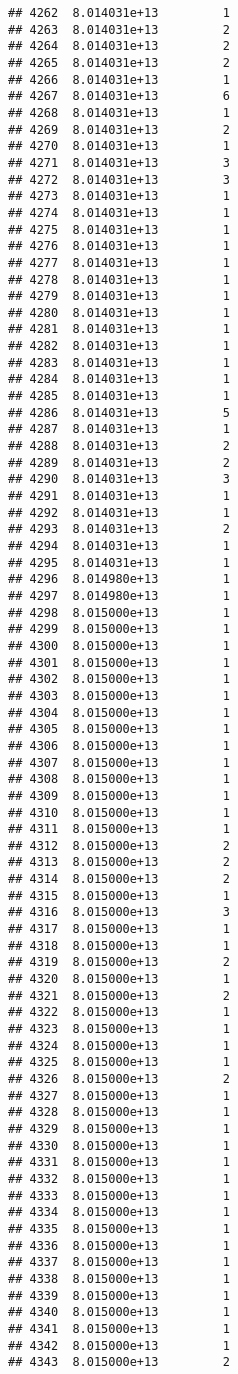 \documentclass[
]{article}
\begin{document}
\begin{verbatim}
## 4262  8.014031e+13         1
## 4263  8.014031e+13         2
## 4264  8.014031e+13         2
## 4265  8.014031e+13         2
## 4266  8.014031e+13         1
## 4267  8.014031e+13         6
## 4268  8.014031e+13         1
## 4269  8.014031e+13         2
## 4270  8.014031e+13         1
## 4271  8.014031e+13         3
## 4272  8.014031e+13         3
## 4273  8.014031e+13         1
## 4274  8.014031e+13         1
## 4275  8.014031e+13         1
## 4276  8.014031e+13         1
## 4277  8.014031e+13         1
## 4278  8.014031e+13         1
## 4279  8.014031e+13         1
## 4280  8.014031e+13         1
## 4281  8.014031e+13         1
## 4282  8.014031e+13         1
## 4283  8.014031e+13         1
## 4284  8.014031e+13         1
## 4285  8.014031e+13         1
## 4286  8.014031e+13         5
## 4287  8.014031e+13         1
## 4288  8.014031e+13         2
## 4289  8.014031e+13         2
## 4290  8.014031e+13         3
## 4291  8.014031e+13         1
## 4292  8.014031e+13         1
## 4293  8.014031e+13         2
## 4294  8.014031e+13         1
## 4295  8.014031e+13         1
## 4296  8.014980e+13         1
## 4297  8.014980e+13         1
## 4298  8.015000e+13         1
## 4299  8.015000e+13         1
## 4300  8.015000e+13         1
## 4301  8.015000e+13         1
## 4302  8.015000e+13         1
## 4303  8.015000e+13         1
## 4304  8.015000e+13         1
## 4305  8.015000e+13         1
## 4306  8.015000e+13         1
## 4307  8.015000e+13         1
## 4308  8.015000e+13         1
## 4309  8.015000e+13         1
## 4310  8.015000e+13         1
## 4311  8.015000e+13         1
## 4312  8.015000e+13         2
## 4313  8.015000e+13         2
## 4314  8.015000e+13         2
## 4315  8.015000e+13         1
## 4316  8.015000e+13         3
## 4317  8.015000e+13         1
## 4318  8.015000e+13         1
## 4319  8.015000e+13         2
## 4320  8.015000e+13         1
## 4321  8.015000e+13         2
## 4322  8.015000e+13         1
## 4323  8.015000e+13         1
## 4324  8.015000e+13         1
## 4325  8.015000e+13         1
## 4326  8.015000e+13         2
## 4327  8.015000e+13         1
## 4328  8.015000e+13         1
## 4329  8.015000e+13         1
## 4330  8.015000e+13         1
## 4331  8.015000e+13         1
## 4332  8.015000e+13         1
## 4333  8.015000e+13         1
## 4334  8.015000e+13         1
## 4335  8.015000e+13         1
## 4336  8.015000e+13         1
## 4337  8.015000e+13         1
## 4338  8.015000e+13         1
## 4339  8.015000e+13         1
## 4340  8.015000e+13         1
## 4341  8.015000e+13         1
## 4342  8.015000e+13         1
## 4343  8.015000e+13         2

\end{verbatim}
\end{document}
